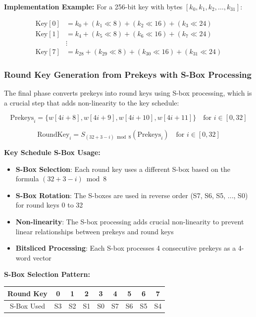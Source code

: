 \documentclass[12pt,a4paper]{article}
\begin{document}
\textbf{Implementation Example:}
For a 256-bit key with bytes $[k_0, k_1, k_2, \ldots, k_{31}]$:

\begin{align*}
\text{Key}[0] &= k_0 + (k_1 \ll 8) + (k_2 \ll 16) + (k_3 \ll 24) \\
\text{Key}[1] &= k_4 + (k_5 \ll 8) + (k_6 \ll 16) + (k_7 \ll 24) \\
&\vdots \\
\text{Key}[7] &= k_{28} + (k_{29} \ll 8) + (k_{30} \ll 16) + (k_{31} \ll 24)
\end{align*}

\subsubsection{Round Key Generation from Prekeys with S-Box Processing}

The final phase converts prekeys into round keys using S-box processing, which is a crucial step that adds non-linearity to the key schedule:

\begin{equation}
\text{Prekeys}_i = \{w[4i+8], w[4i+9], w[4i+10], w[4i+11]\} \quad \text{for } i \in [0, 32]
\end{equation}

\begin{equation}
\text{RoundKey}_i = S_{(32+3-i) \bmod 8}(\text{Prekeys}_i) \quad \text{for } i \in [0, 32]
\end{equation}

\textbf{Key Schedule S-Box Usage:}
\begin{itemize}
    \item \textbf{S-Box Selection}: Each round key uses a different S-box based on the formula $(32+3-i) \bmod 8$
    \item \textbf{S-Box Rotation}: The S-boxes are used in reverse order (S7, S6, S5, ..., S0) for round keys 0 to 32
    \item \textbf{Non-linearity}: The S-box processing adds crucial non-linearity to prevent linear relationships between prekeys and round keys
    \item \textbf{Bitsliced Processing}: Each S-box processes 4 consecutive prekeys as a 4-word vector
\end{itemize}

\textbf{S-Box Selection Pattern:}
\begin{center}
\begin{tabular}{|c|c|c|c|c|c|c|c|c|}
\hline
Round Key & 0 & 1 & 2 & 3 & 4 & 5 & 6 & 7 \\
\hline
S-Box Used & S3 & S2 & S1 & S0 & S7 & S6 & S5 & S4 \\
\hline
\end{tabular}
\end{center}
\end{document}
